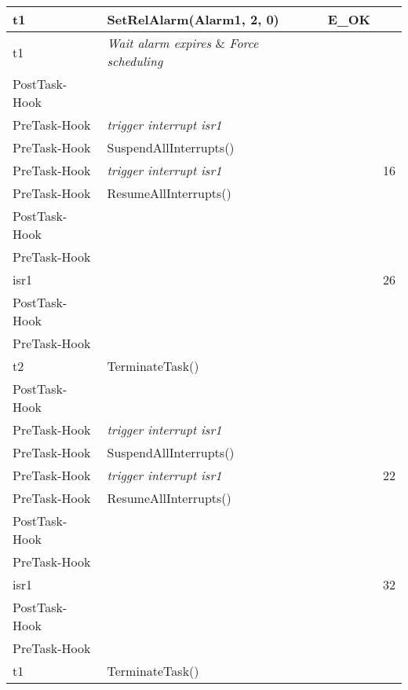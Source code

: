 \documentclass[10pt]{article}
\newlength{\Li}\settowidth{\Li}{Running}
\newlength{\Lii}\setlength{\Lii}{7cm}
\newlength{\Liiii}\setlength{\Liiii}{0.9cm}
\newlength{\Liii}\setlength{\Liii}{\textwidth} \addtolength{\Liii}{-\Li} \addtolength{\Liii}{-\Lii} \addtolength{\Liii}{-\Liiii}
\begin{document}
\begin{supertabular}{|p{\Li}|p{\Lii}|p{\Liii}|p{\Liiii}|}
	t1			& SetRelAlarm(Alarm1, 2, 0)					& E\_OK			& \\ \hline
	t1			& \textit{Wait alarm expires} \& \textit{Force scheduling} 	& 			&  \\ \hline 
	
	PostTask-Hook	&										&				& \\ \hline
	PreTask-Hook	& \textit{trigger interrupt isr1}					&				& \\ \hline
	PreTask-Hook	& SuspendAllInterrupts()						&				& \\ \hline
	PreTask-Hook	& \textit{trigger interrupt isr1}					&				& 16\\ \hline
	PreTask-Hook	& ResumeAllInterrupts()						&				& \\ \hline
	
	PostTask-Hook	&										&				& \\ \hline
	PreTask-Hook	&										&				& \\ \hline
		
	isr1			& 										& 				& 26\\ \hline
	
	PostTask-Hook	&										&				& \\ \hline
	PreTask-Hook	&										&				& \\ \hline
		
	t2			& TerminateTask()							& 				& \\ \hline
	
	PostTask-Hook	&										&				& \\ \hline
	PreTask-Hook	& \textit{trigger interrupt isr1}					&				& \\ \hline
	PreTask-Hook	& SuspendAllInterrupts()						&				& \\ \hline
	PreTask-Hook	& \textit{trigger interrupt isr1}					&				& 22\\ \hline
	PreTask-Hook	& ResumeAllInterrupts()						&				& \\ \hline
	
	PostTask-Hook	&										&				& \\ \hline
	PreTask-Hook	&										&				& \\ \hline
	
	isr1			& 										& 				& 32\\ \hline
	
	PostTask-Hook	&										&				& \\ \hline
	PreTask-Hook	&										&				& \\ \hline
	
	t1			& TerminateTask()							& 				& \\ \hline
	
	\end{supertabular}\\
\end{document}
